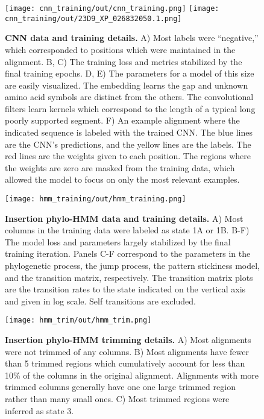 \documentclass[10pt,letterpaper]{article}
\begin{document}
\begin{figure}[h!]
\texttt{[image: cnn\_training/out/cnn\_training.png]}
\texttt{[image: cnn\_training/out/23D9\_XP\_026832050.1.png]}
\centering
\caption{\textbf{CNN data and training details.}
A) Most labels were “negative,” which corresponded to positions which were maintained in the alignment. B, C) The training loss and metrics stabilized by the final training epochs. D, E) The parameters for a model of this size are easily visualized. The embedding learns the gap and unknown amino acid symbols are distinct from the others. The convolutional filters learn kernels which correspond to the length of a typical long poorly supported segment. F) An example alignment where the indicated sequence is labeled with the trained CNN. The blue lines are the CNN’s predictions, and the yellow lines are the labels. The red lines are the weights given to each position. The regions where the weights are zero are masked from the training data, which allowed the model to focus on only the most relevant examples. }
\label{sfig:cnn_training}
\end{figure}

\begin{figure}[h!]
\texttt{[image: hmm\_training/out/hmm\_training.png]}
\centering
\caption{\textbf{Insertion phylo-HMM data and training details.}
A) Most columns in the training data were labeled as state 1A or 1B. B-F) The model loss and parameters largely stabilized by the final training iteration. Panels C-F correspond to the parameters in the phylogenetic process, the jump process, the pattern stickiness model, and the transition matrix, respectively. The transition matrix plots are the transition rates to the state indicated on the vertical axis and given in log scale. Self transitions are excluded.}
\label{sfig:hmm_training}
\end{figure}

\begin{figure}[h!]
\texttt{[image: hmm\_trim/out/hmm\_trim.png]}
\centering
\caption{\textbf{Insertion phylo-HMM trimming details.}
A) Most alignments were not trimmed of any columns. B) Most alignments have fewer than 5 trimmed regions which cumulatively account for less than 10\% of the columns in the original alignment. Alignments with more trimmed columns generally have one one large trimmed region rather than many small ones. C) Most trimmed regions were inferred as state 3.}
\label{sfig:hmm_trim}
\end{figure}
\end{document}

